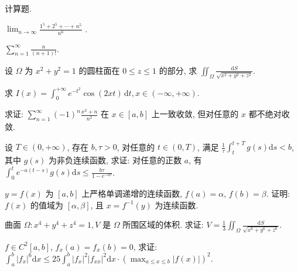\par{}
计算题.\par
$\lim_{n\to\infty}\frac{1^{5}+2^{5}+\cdots+n^{5}}{n^{6}}$ .\par
$\sum_{n=1}^{\infty} \frac{n}{(n+1)!}$.\par
设 $\Omega$ 为 $x^{2} + y^{2} = 1$ 的圆柱面在 $0 \leq z \leq 1$ 的部分, 求 $\iint_{\Omega} \frac{\mathrm{d}S}{\sqrt{x^2 + y^2 + z^2}}$.\par
求 $I(x) = \int_{0}^{+\infty} e^{-t^2} \cos(2xt) \, \mathrm{d}t, x \in (-\infty, +\infty)$.\par
\par{}
求证: $\sum_{n=1}^{\infty} (-1)^{n} \frac{x^{2} + n}{n^{2}}$ 在 $x \in [a, b]$ 上一致收敛, 但对任意的 $x$ 都不绝对收敛.\par
\par{}
设 $T \in (0, +\infty)$, 存在 $b, \tau > 0$, 对任意的 $t \in (0, T)$, 满足 $\frac{1}{\tau} \int_{t}^{t + T} g(s) \mathrm{d}s < b$, 其中 $g(s)$ 为非负连续函数, 求证: 对任意的正数 $a$, 有 $\int_{0}^{t} e^{-a(t - s)} g(s) \mathrm{d}s \leq \frac{b\tau}{1 - e^{-a\tau}}$.\par
\par{}
$y = f(x)$ 为 $[a, b]$ 上严格单调递增的连续函数, $f(a) = \alpha$, $f(b) = \beta$. 证明: $f(x)$ 的值域为 $[\alpha, \beta]$, 且 $x = f^{-1}(y)$ 为连续函数.\par
\par{}
曲面 $\Omega: x^4 + y^4 + z^4 = 1, V$ 是 $\Omega$ 所围区域的体积. 求证: $V = \frac{1}{3} \iint_{\Omega} \frac{\mathrm{d}S}{\sqrt{x^6 + y^6 + z^6}}$.\par
\par{}
$f \in C^2[a, b]$, $f_x(a) = f_x(b) = 0$, 求证: $\int_{a}^{b} |f_x|^6 \mathrm{d}x \leq 25 \int_{a}^{b} |f_x|^2 |f_{xx}|^2 \mathrm{d}x \cdot (\max_{a \leq x \leq b} |f(x)|)^2$.\par
